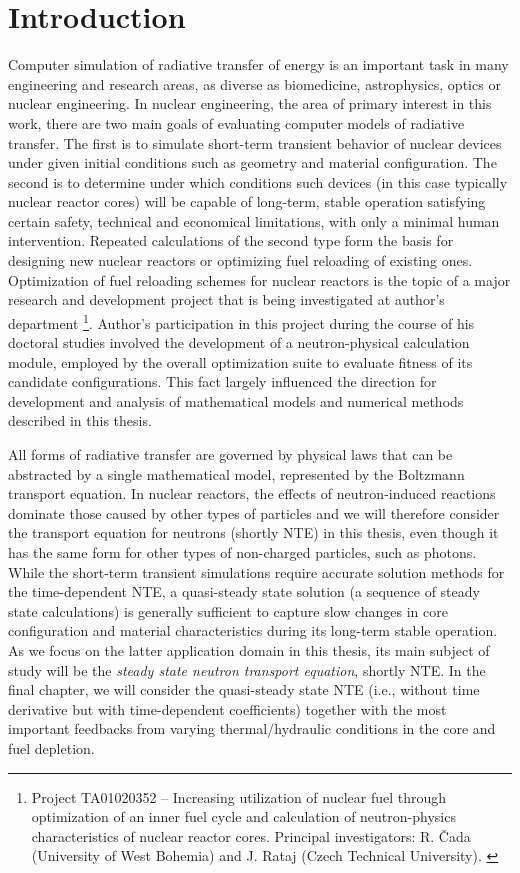 \chapter{Introduction}

Computer simulation of radiative transfer of energy is an important task in many engineering and research areas, as
diverse as biomedicine, astrophysics, optics or nuclear engineering. In nuclear engineering, the area of primary
interest in this work, there are two main goals of evaluating computer models of radiative transfer. The first is to
simulate short-term transient behavior of nuclear devices under given initial conditions such as geometry and material
configuration. The second is to determine under which conditions such devices (in this case typically nuclear reactor
cores) will be capable of long-term, stable operation satisfying certain safety, technical and economical limitations,
with only a minimal human intervention. Repeated calculations of the second type form the basis for designing new
nuclear reactors or optimizing fuel reloading of existing ones. Optimization of fuel reloading schemes for nuclear
reactors is the topic of a major research and development project that is being investigated at author's department
\footnote{Project TA01020352 -- Increasing utilization of nuclear fuel through optimization of an inner fuel cycle and
calculation of neutron-physics characteristics of nuclear reactor cores. Principal investigators: R. {\v C}ada
(University of West Bohemia) and J. Rataj (Czech Technical University). \label{ftn:TACR}}.
Author's participation in this project during the course of his doctoral studies involved the development of a
neutron-physical calculation module, employed by the overall optimization suite to evaluate fitness of its candidate
configurations. This fact largely influenced the direction for development and analysis of mathematical models and
numerical methods described in this thesis.

All forms of radiative transfer are governed by physical laws that can be abstracted by a single mathematical model,
represented by the Boltzmann transport equation. In nuclear reactors, the effects of neutron-induced reactions dominate
those caused by other types of particles and we will therefore consider the transport equation for neutrons (shortly
NTE) in this thesis, even though it has the same form for other types of
non-charged particles, such as photons. While the short-term transient simulations require accurate solution methods for
the time-dependent NTE, a quasi-steady state solution (a sequence of steady state calculations) is generally sufficient
to capture slow changes in core configuration and material characteristics during its long-term stable operation.
As we focus on the latter application domain in this thesis, its main subject of study will be the \textit{steady
state neutron transport equation}, shortly NTE. In the final chapter, we will consider the quasi-steady state NTE
(i.e., without time derivative but with time-dependent coefficients) together with the most important feedbacks from
varying thermal/hydraulic conditions in the core and fuel depletion.

